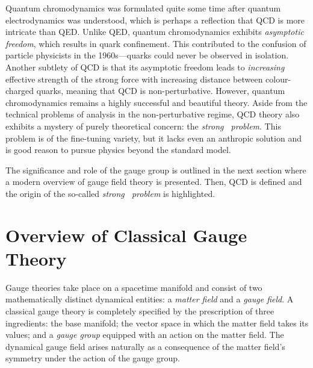 Quantum chromodynamics was formulated quite some time after quantum electrodynamics was understood, which is perhaps a reflection that QCD is more intricate than QED.
Unlike QED, quantum chromodynamics exhibits \emph{asymptotic freedom}, which results in quark confinement.
This contributed to the confusion of particle physicists in the 1960s---quarks could never be observed in isolation.
Another subtlety of QCD is that its asymptotic freedom leads to \emph{increasing} effective strength of the strong force with increasing distance between colour-charged quarks, meaning that QCD is non-perturbative.
However, quantum chromodynamics remains a highly successful and beautiful theory.
Aside from the technical problems of analysis in the non-perturbative regime, QCD theory also exhibits a mystery of purely theoretical concern: the \emph{strong \CP\ problem}.
This problem is of the fine-tuning variety, but it lacks even an anthropic solution and is good reason to pursue physics beyond the standard model.


The significance and role of the gauge group is outlined in the next section where a modern overview of gauge field theory
is presented.
Then, QCD is defined and the origin of the so-called \emph{strong \CP\ problem} is highlighted.



\section{Overview of Classical Gauge Theory}
\label{sec:overview-of-gauge-theory}

Gauge theories take place on a spacetime manifold and consist of two mathematically distinct dynamical entities: a \emph{matter field} and a \emph{gauge field}.
A classical gauge theory is completely specified by the prescription of three ingredients: the base manifold; the vector space in which the matter field takes its values; and a \emph{gauge group} equipped with an action on the matter field.
The dynamical gauge field arises naturally as a consequence of the matter field's symmetry under the action of the gauge group.

